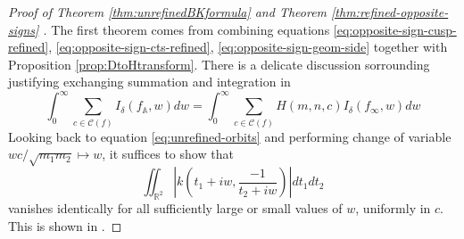 \documentclass{article}
\numberwithin{equation}{section}
\begin{document}
\begin{proof}[Proof of Theorem \ref{thm:unrefinedBKformula} and Theorem \ref{thm:refined-opposite-signs} ] The first theorem comes from combining equations  \eqref{eq:opposite-sign-cusp-refined}, \eqref{eq:opposite-sign-cts-refined}, \eqref{eq:opposite-sign-geom-side} together with Proposition \ref{prop:DtoHtransform}. There is a delicate discussion sorrounding justifying exchanging summation and integration in
$$\int_0^\infty\sum_{c\in\mathcal{C}(f)}I_\delta(f_\mathbb{A},w)dw=\int_0^\infty\sum_{c\in \mathcal{C}(f)}H(m,n,c)I_\delta(f_\infty,w)dw$$
Looking back to equation \eqref{eq:unrefined-orbits} and performing change of variable $wc/\sqrt{m_1m_2} \mapsto w$, it suffices to show that
$$\iint_{\mathbb{R}^2}\left|k\left(t_1+iw, \frac{-1}{t_2+iw}\right) \right|dt_1 dt_2 $$
vanishes identically for all sufficiently large or small values of $w$, uniformly in $c$. This is shown in \cite[\S 2.2.7]{generalised}.



\end{proof}
\end{document}

